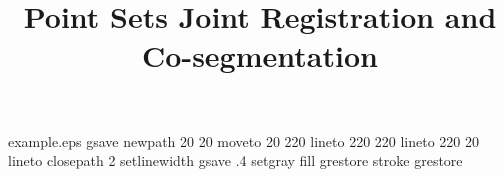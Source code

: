 %
%
%
%
%
\begin{filecontents*}{example.eps}
gsave
newpath
  20 20 moveto
  20 220 lineto
  220 220 lineto
  220 20 lineto
closepath
2 setlinewidth
gsave
  .4 setgray fill
grestore
stroke
grestore
\end{filecontents*}
%
\RequirePackage{fix-cm}
%
\documentclass[twocolumn]{svjour3}          %
%
\smartqed  %
%
\usepackage{graphicx}
\usepackage{amsmath}
\usepackage{amsfonts}
\usepackage{algorithm}
\usepackage{color}
%
\usepackage{mathptmx}      %
\usepackage{hyperref}
%
\newcommand{\mdf}[1]{\textcolor[rgb]{1.00,0.00,1.00}{#1}}
\newcommand{\vb}[1]{\mathbf{#1}}
\newcommand{\defV}{\mathcal{V}}
\newcommand{\defZ}{\mathcal{Z}}
\newcommand{\comments}[1]{}
%
%


\title{Point Sets Joint Registration and Co-segmentation%
}
\subtitle{}

